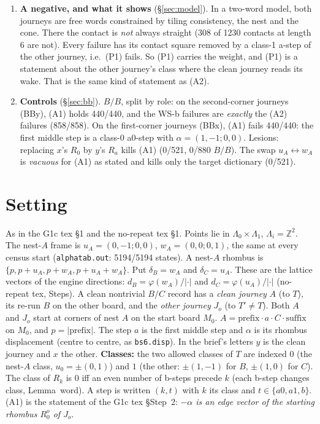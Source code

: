 \documentclass[11pt]{article}
\theoremstyle{definition}\newtheorem{definition}[theorem]{Definition}\newtheorem{remark}[theorem]{Remark}
\newcommand{\Z}{\mathbb Z}
\begin{document}
\begin{enumerate}
\item \textbf{A negative, and what it shows} (\S\ref{sec:model}). In a two-word model, both journeys are free words constrained by tiling consistency, the nest and the cone. There the contact is \emph{not} always straight (308 of 1230 contacts at length 6 are not). Every failure has its contact square removed by a class-1 a-step of the other journey, i.e.\ (P1) fails.
So (P1) carries the weight, and (P1) is a statement about the other journey's class where the clean journey reads its wake. That is the same kind of statement as (A2).
\item \textbf{Controls} (\S\ref{sec:bb}). $B/B$, split by role: on the second-corner journeys (BBy), (A1) holds 440/440, and the WS-b failures are \emph{exactly} the (A2) failures (858/858). On the first-corner journeys (BBx), (A1) fails 440/440: the first middle step is a class-0 a0-step with $\alpha=(1,-1;0,0)$.
Lesions: replacing $x$'s $R_0$ by $y$'s $R_a$ kills (A1) (0/521, 0/880 $B/B$). The swap $u_A\leftrightarrow w_A$ is \emph{vacuous} for (A1) as stated and kills only the target dictionary (0/521).
\end{enumerate}

\section{Setting}\label{sec:set}
As in the G1c tex \S1 and the no-repeat tex \S1. Points lie in $\Lambda_0\times\Lambda_1$, $\Lambda_i=\Z^2$. The nest-$A$ frame is $u_A=(0,-1;0,0)$, $w_A=(0,0;0,1)$, the same at every census start (\texttt{alphatab.out}: 5194/5194 states). A nest-$A$ rhombus is $\{p,p+u_A,p+w_A,p+u_A+w_A\}$.
Put $\delta_B=w_A$ and $\delta_C=u_A$. These are the lattice vectors of the engine directions: $d_B=\varphi(w_A)/|\cdot|$ and $d_C=\varphi(u_A)/|\cdot|$ (no-repeat tex, Steps).
A clean nontrivial $B/C$ record has a \emph{clean journey} $A$ (to $T$), its re-run $B$ on the other board, and the \emph{other journey} $J_o$ (to $T'\ne T$). Both $A$ and $J_o$ start at corners of nest $A$ on the start board $M_0$.
$A=\text{prefix}\cdot a\cdot C\cdot\text{suffix}$ on $M_0$, and $p=|\text{prefix}|$. The step $a$ is the first middle step and $\alpha$ is its rhombus displacement (centre to centre, as \texttt{bs6.disp}). In the brief's letters $y$ is the clean journey and $x$ the other.
\textbf{Classes:} the two allowed classes of $T$ are indexed $0$ (the nest-$A$ class, $u_0=\pm(0,1)$) and $1$ (the other: $\pm(1,-1)$ for $B$, $\pm(1,0)$ for $C$). The class of $R_k$ is $0$ iff an even number of b-steps precede $k$ (each b-step changes class, Lemma~word). A step is written $(k,t)$ with $k$ its class and $t\in\{a0,a1,b\}$.
(A1) is the statement of the G1c tex \S Step~2: \emph{$-\alpha$ is an edge vector of the starting rhombus $R_0^o$ of $J_o$}.
\end{document}

